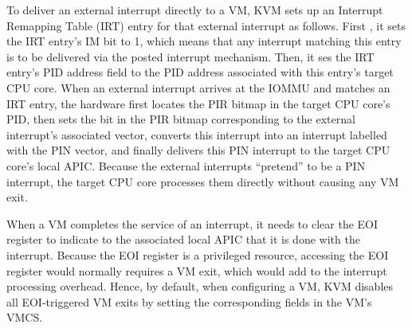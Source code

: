 To deliver an external interrupt directly to a VM, KVM sets up an Interrupt Remapping Table (IRT) entry for that external interrupt as follows.
First , it sets the IRT entry's IM bit to 1, which means that any interrupt matching this entry is to be delivered via the posted interrupt mechanism.  
Then, it ses the IRT entry's PID address field to the PID address associated with this entry's target CPU core. 
When an external interrupt arrives at the IOMMU and matches an IRT entry, the 
hardware first locates the PIR bitmap in the target CPU core's PID, then sets the bit in the PIR bitmap corresponding to the external interrupt's associated vector,
converts this interrupt into an interrupt labelled with the PIN vector, and finally delivers this PIN interrupt to the target CPU core's local APIC.
Because the external interrupts ``pretend'' to be a PIN interrupt, the target CPU core processes them directly without causing any VM exit.

When a VM completes the service of an interrupt, it needs to clear the EOI register to indicate to the 
associated local APIC that it is done with the interrupt. Because the EOI register is a privileged resource, accessing the EOI register
would normally requires a VM exit, which would add to the interrupt processing overhead. 
Hence, by default, when configuring a VM, KVM disables all EOI-triggered VM exits by setting the corresponding fields in the VM's VMCS.

